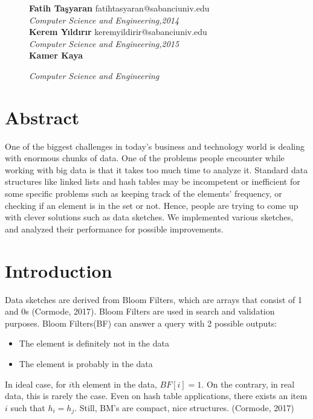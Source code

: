 \documentclass[twoside]{article}
\begin{document}
	\thispagestyle{firststyle}
	\begin{figure}
	

\textbf{Fatih Taşyaran} \hfill fatihtasyaran@sabanciuniv.edu \\
\hfill	\textit{Computer Science and Engineering,2014} \\
\textbf{Kerem Yıldırır} \hfill keremyildirir@sabanciuniv.edu \\
\hfill	\textit{Computer Science and Engineering,2015} \\
\textbf{Kamer Kaya} \par
\textit{Computer Science and Engineering}
	
	\end{figure}
	\section{Abstract}
	One of the biggest challenges in today's business and technology world is dealing with enormous chunks of data. One of the problems people encounter while working with big data is that it takes too much time to analyze it. Standard data structures like linked lists and hash tables may be incompetent or inefficient for some specific problems such as keeping track of the elements' frequency, or checking if an element is in the set or not. Hence, people are trying  to come up with clever solutions such as data sketches. We implemented various sketches, and analyzed their performance for possible improvements.
\section{Introduction}

Data sketches are derived from Bloom Filters, which are arrays that consist of 1 and 0s (Cormode, 2017). Bloom Filters are used in search and validation purposes. Bloom Filters(BF) can answer a query with 2 possible outputs: \begin{itemize}
	\item The element is definitely not in the data
	\item The element is probably in the data 
	
\end{itemize}
 In ideal case, for $i$th element in the data, $BF[i]=1$. On the contrary, in real data, this is rarely the case. Even on hash table applications, there exists an item $i$ such that $h_{i}=h_{j}$. Still,
 BM's are compact, nice structures. (Cormode, 2017)
\end{document}
